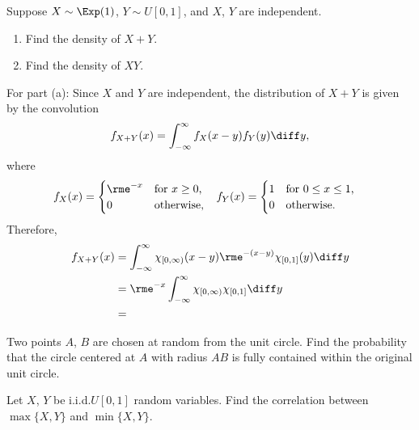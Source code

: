 \begin{problem}[Handout 17, \# 16]
  Suppose \(X\sim\Exp(1)\), \(Y\sim U[0,1]\), and \(X\), \(Y\) are
  independent.
  \begin{enumerate}[label=(\alph*),noitemsep]
  \item Find the density of \(X+Y\).
  \item Find the density of \(XY\).
  \end{enumerate}
\end{problem}
\begin{solution}
  For part (a): Since \(X\) and \(Y\) are independent, the distribution of
  \(X+Y\) is given by the convolution
  \[
    f_{X+Y}(x)=\int_{-\infty}^\infty f_X(x-y)f_Y(y)\diff y,
  \]
  where
  \begin{align*}
    f_X(x)
      &=\begin{cases}
        \rme^{-x}&\text{for \(x\geq 0\),}\\
        0&\text{otherwise,}
      \end{cases}
    &f_Y(x)
       &=\begin{cases}
         1&\text{for \(0\leq x\leq 1\),}\\
         0&\text{otherwise.}
       \end{cases}
  \end{align*}
  Therefore,
  \begin{align*}
    f_{X+Y}(x)
    &=\int_{-\infty}^\infty
      \chi_{[0,\infty)}(x-y)\rme^{-(x-y)}\chi_{[0,1]}(y)\diff y\\
    &=\rme^{-x}\int_{-\infty}^{\infty}\chi_{[0,\infty)}\chi_{[0,1]}\diff
      y\\
    &=
  \end{align*}
\end{solution}
\newpage

\begin{problem}[Handout 17, \# 18]
  Two points \(A\), \(B\) are chosen at random from the unit circle. Find
  the probability that the circle centered at \(A\) with radius \(AB\) is
  fully contained within the original unit circle.
\end{problem}
\begin{solution}
\end{solution}
\newpage

\begin{problem}[Handout 17, \# 19]
  Let \(X\), \(Y\) be i.i.d.\@ \(U[0,1]\) random variables. Find the
  correlation between \(\max\{X,Y\}\) and \(\min\{X,Y\}\).
\end{problem}
\begin{solution}
\end{solution}

